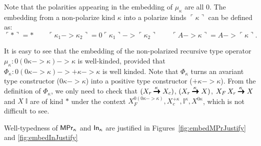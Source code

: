 Note that the polarities appearing in the embedding of $\mu_\kappa$ are all
$0$. The embedding from a non-polarize kind $\kappa$ into
a polarize kinds $\ulcorner\kappa\urcorner$ can be defined as:
\[ \ulcorner * \urcorner = * \qquad
\ulcorner \kappa_1 -> \kappa_2 \urcorner =
0\ulcorner\kappa_1\urcorner -> \ulcorner\kappa_2\urcorner \qquad
\ulcorner A -> \kappa \urcorner = A -> \ulcorner \kappa \urcorner.
\]

It is easy to see that the embedding of the non-polarized recursive
type operator $\mu_\kappa : 0(0\kappa -> \kappa) -> \kappa$
is well-kinded, provided that
$\Phi_\kappa : 0(0\kappa -> \kappa) -> +\kappa -> \kappa$
is well kinded. Note that $\Phi_\kappa$ turns an avariant type constructor
($0\kappa -> \kappa$) into a positive type constructor
($+\kappa -> \kappa$). From the definition of $\Phi_\kappa$, we only need 
to check that $(X_r \stackrel{\kappa\;}{\pmb{\pmb{->}}} X_c)$, $(X_r \stackrel{\kappa\;}{\pmb{\pmb{->}}} X)$,
$X_F\,X_r \stackrel{\kappa\;}{\pmb{\pmb{->}}} X$ and $X\;\mathbb{I}$ are of kind $*$
under the context $ X_{\!F}^{0(0\kappa -> \kappa)},
		X_c^{+\kappa}, \mathbb{I}^\kappa, X^{0\kappa}$,
which is not difficult to see.

Well-typedness of $\mathsf{MPr}_\kappa$ and $\mathsf{In}_\kappa$ are justified in
Figures~\ref{fig:embedMPrJustify} and \ref{fig:embedInJustify}


